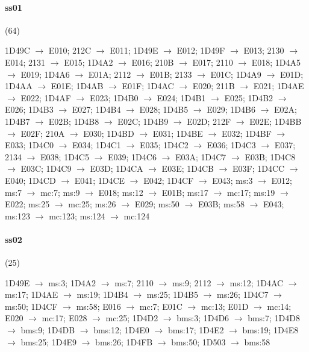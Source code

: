 \paragraph{ss01} (64)
\raggedright\small 1D49C $\to$ E010; 212C $\to$ E011; 1D49E $\to$ E012; 1D49F
$\to$ E013; 2130 $\to$ E014; 2131 $\to$ E015; 1D4A2 $\to$ E016; 210B $\to$
E017; 2110 $\to$ E018; 1D4A5 $\to$ E019; 1D4A6 $\to$ E01A; 2112 $\to$ E01B;
2133 $\to$ E01C; 1D4A9 $\to$ E01D; 1D4AA $\to$ E01E; 1D4AB $\to$ E01F; 1D4AC
$\to$ E020; 211B $\to$ E021; 1D4AE $\to$ E022; 1D4AF $\to$ E023; 1D4B0 $\to$
E024; 1D4B1 $\to$ E025; 1D4B2 $\to$ E026; 1D4B3 $\to$ E027; 1D4B4 $\to$ E028;
1D4B5 $\to$ E029; 1D4B6 $\to$ E02A; 1D4B7 $\to$ E02B; 1D4B8 $\to$ E02C; 1D4B9
$\to$ E02D; 212F $\to$ E02E; 1D4BB $\to$ E02F; 210A $\to$ E030; 1D4BD $\to$
E031; 1D4BE $\to$ E032; 1D4BF $\to$ E033; 1D4C0 $\to$ E034; 1D4C1 $\to$ E035;
1D4C2 $\to$ E036; 1D4C3 $\to$ E037; 2134 $\to$ E038; 1D4C5 $\to$ E039; 1D4C6
$\to$ E03A; 1D4C7 $\to$ E03B; 1D4C8 $\to$ E03C; 1D4C9 $\to$ E03D; 1D4CA $\to$
E03E; 1D4CB $\to$ E03F; 1D4CC $\to$ E040; 1D4CD $\to$ E041; 1D4CE $\to$ E042;
1D4CF $\to$ E043; ms:3 $\to$ E012; ms:7 $\to$ mc:7; ms:9 $\to$ E018; ms:12
$\to$ E01B; ms:17 $\to$ mc:17; ms:19 $\to$ E022; ms:25 $\to$ mc:25; ms:26 $\to$
E029; ms:50 $\to$ E03B; ms:58 $\to$ E043; ms:123 $\to$ mc:123; ms:124 $\to$
mc:124\par

\paragraph{ss02} (25)
\raggedright\small 1D49E $\to$ ms:3; 1D4A2 $\to$ ms:7; 2110 $\to$ ms:9; 2112
$\to$ ms:12; 1D4AC $\to$ ms:17; 1D4AE $\to$ ms:19; 1D4B4 $\to$ ms:25; 1D4B5
$\to$ ms:26; 1D4C7 $\to$ ms:50; 1D4CF $\to$ ms:58; E016 $\to$ mc:7; E01C $\to$
mc:13; E01D $\to$ mc:14; E020 $\to$ mc:17; E028 $\to$ mc:25; 1D4D2 $\to$ bms:3;
1D4D6 $\to$ bms:7; 1D4D8 $\to$ bms:9; 1D4DB $\to$ bms:12; 1D4E0 $\to$ bms:17;
1D4E2 $\to$ bms:19; 1D4E8 $\to$ bms:25; 1D4E9 $\to$ bms:26; 1D4FB $\to$ bms:50;
1D503 $\to$ bms:58\par

